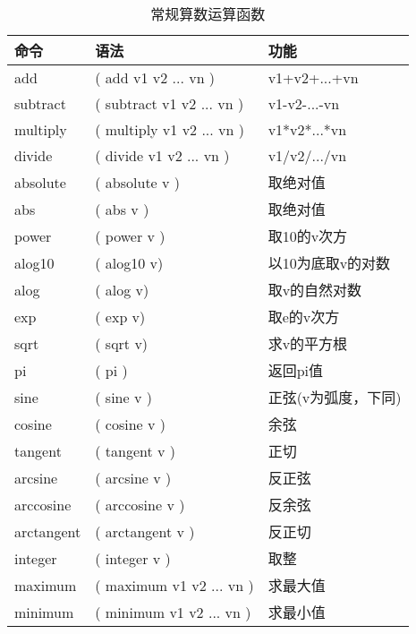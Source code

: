 \begin{table}[!ht]
\centering
\ttfamily
\small
\caption{常规算数运算函数}
\label{table:regular-arithmetic-functions}
\begin{tabular}{lll}
	\toprule
	命令	&	语法	&	功能	\\
	\midrule
	add		&	( add v1 v2 ... vn )	    &	v1+v2+...+vn	\\
	subtract&	( subtract v1 v2 ... vn )   &	v1-v2-...-vn	\\
	multiply&	( multiply v1 v2 ... vn )   &	v1*v2*...*vn	\\
	divide	&	( divide v1 v2 ... vn )	    &	v1/v2/.../vn	\\
	absolute&	( absolute v )			    &	取绝对值	\\
	abs     &	( abs v )			        &	取绝对值	\\
	power	&	( power v )				    &	取10的v次方     \\
	alog10	&	( alog10 v)				    &	以10为底取v的对数	\\
	alog	&	( alog v)				    &	取v的自然对数	\\
	exp	    &	( exp v)				    &	取e的v次方	\\
	sqrt	&	( sqrt v) 				    &	求v的平方根	\\
	pi		&	( pi )					    &	返回pi值	\\
    sine    &	( sine v )				    &	正弦(v为弧度，下同)\\
	cosine	&	( cosine v )				&	余弦	\\
    tangent	&	( tangent v )			    &	正切	\\
	arcsine	&	( arcsine v )			    &	反正弦	\\
	arccosine&	( arccosine v ) 			&	反余弦	\\
	arctangent&	( arctangent v )			&	反正切	\\
    integer &	( integer v )			    &	取整	\\
	maximum	&	( maximum v1 v2 ... vn )	&	求最大值	\\
	minimum	&	( minimum v1 v2 ... vn )	&	求最小值	\\
	\bottomrule
\end{tabular}
\end{table}

